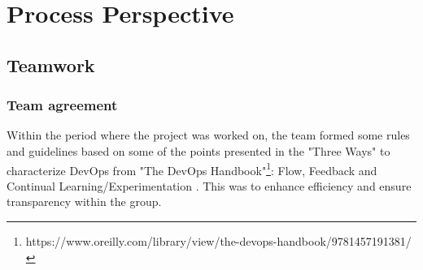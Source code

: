 \newpage
\section{Process Perspective}






\subsection{Teamwork}
\subsubsection{Team agreement}
Within the period where the project was worked on, the team formed some rules and guidelines based on some of the points presented in the "Three Ways" to characterize DevOps from "The DevOps Handbook"\footnote{https://www.oreilly.com/library/view/the-devops-handbook/9781457191381/}: Flow, Feedback and Continual Learning/Experimentation . This was to enhance efficiency and ensure transparency within the group.

